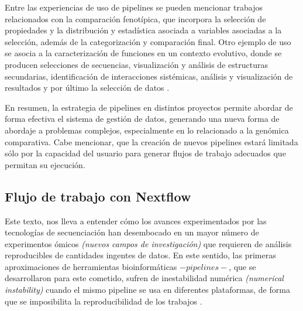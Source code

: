 \documentclass[12pt]{article}
\begin{document}
Entre las experiencias de uso de pipelines se pueden mencionar trabajos 
relacionados con la comparación fenotípica, que incorpora la selección de propiedades 
y la distribución y estadística asociada a variables asociadas a la selección, además 
de la categorización y comparación final. Otro ejemplo de uso se asocia a la 
caracterización de funciones en un contexto evolutivo, donde se producen selecciones 
de secuencias, visualización y análisis de estructuras secundarias, identificación 
de interacciones sistémicas, análisis y visualización de resultados y por último la 
selección de datos \cite{Hadad}.

En resumen, la estrategia de pipelines en distintos proyectos permite abordar de 
forma efectiva el sistema de gestión de datos, generando una nueva forma de abordaje 
a problemas complejos, especialmente en lo relacionado a la genómica comparativa. 
Cabe mencionar, que la creación de nuevos pipelines estará limitada sólo por la 
capacidad del usuario para generar flujos de trabajo adecuados que permitan su 
ejecución.

\subsection*{Flujo de trabajo con Nextflow}

Este texto, nos lleva a entender cómo los avances experimentados por las 
tecnologías de secuenciación han desembocado en un mayor número de experimentos 
ómicos \emph{(nuevos campos de investigación)} que requieren de análisis reproducibles 
de cantidades ingentes de datos. En este sentido, las primeras aproximaciones 
de herramientas bioinformáticas $-pipelines-$, que se desarrollaron para este 
cometido, sufren de inestabilidad numérica \emph{(numerical instability)} cuando 
el mismo pipeline se usa en diferentes plataformas, de forma que se imposibilita 
la reproducibilidad de los trabajos \cite{Lomas}. 
\end{document}
